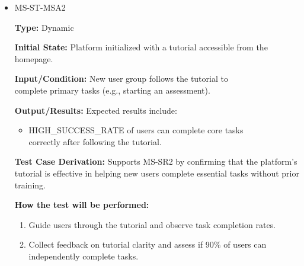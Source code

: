 \documentclass[12pt, titlepage]{article}
\begin{document}
\begin{itemize}
  \item MS-ST-MSA2
  \begin{mdframed}[linewidth=0.5mm] 
    \textbf{Type:} Dynamic \par 
    \textbf{Initial State:} Platform initialized with a tutorial accessible from the homepage. \par 
    \textbf{Input/Condition:} New user group follows the tutorial to \\complete primary tasks (e.g., starting an assessment). \par 
    \textbf{Output/Results:} Expected results include: 
    \begin{itemize} 
      \item HIGH\_SUCCESS\_RATE of users can complete core tasks \\correctly after following the tutorial. 
    \end{itemize} \par
    \textbf{Test Case Derivation:} Supports MS-SR2 by confirming that the platform’s tutorial is effective in helping new users complete essential tasks without prior training. \par
    \textbf{How the test will be performed:} 
    \begin{enumerate}[noitemsep] 
      \item Guide users through the tutorial and observe task completion rates. 
      \item Collect feedback on tutorial clarity and assess if 90\% of users can independently complete tasks. 
    \end{enumerate} 
  \end{mdframed}


\end{itemize}
\end{document}
